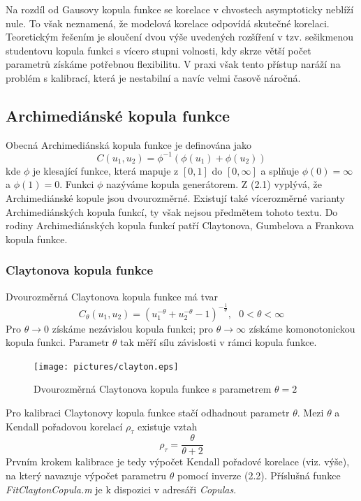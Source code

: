 Na rozdíl od Gausovy kopula funkce se korelace v chvostech asymptoticky neblíží nule. To však neznamená, že modelová korelace odpovídá skutečné korelaci. Teoretickým řešením je sloučení dvou výše uvedených rozšíření v tzv. sešikmenou studentovu kopula funkci s vícero stupni volnosti, kdy skrze větší počet parametrů získáme potřebnou flexibilitu. V praxi však tento přístup naráží na problém s kalibrací, která je nestabilní a navíc velmi časově náročná.

\subsection{Archimediánské kopula funkce}

Obecná Archimediánská kopula funkce je definována jako
\begin{equation}
C(u_1, u_2) = \phi^{-1}\left(\phi(u_1) + \phi(u_2)\right)
\end{equation}
kde $\phi$ je klesající funkce, která mapuje z $[0, 1]$ do $[0, \infty]$ a splňuje $\phi(0) = \infty$ a $\phi(1) = 0$. Funkci $\phi$ nazýváme kopula generátorem. Z (2.1) vyplývá, že Archimediánské kopule jsou dvourozměrné. Existují také vícerozměrné varianty Archimediánských kopula funkcí, ty však nejsou předmětem tohoto textu. Do rodiny Archimediánských kopula funkcí patří Claytonova, Gumbelova a Frankova kopula funkce.

\subsubsection{Claytonova kopula funkce}

Dvourozměrná Claytonova kopula funkce má tvar
\begin{equation*}
C_{\theta}(u_1, u_2) = (u_1^{-\theta} + u_2^{-\theta} - 1)^{-\frac{1}{\theta}}, ~~~ 0 < \theta < \infty
\end{equation*}
Pro $\theta \rightarrow 0$ získáme nezávislou kopula funkci; pro $\theta \rightarrow \infty$ získáme komonotonickou kopula funkci. Parametr $\theta$ tak měří sílu závislosti v rámci kopula funkce.

\begin{figure}[htp]
\centering
\texttt{[image: pictures/clayton.eps]}
\caption{Dvourozměrná Claytonova kopula funkce s parametrem $\theta = 2$}
\end{figure}

Pro kalibraci Claytonovy kopula funkce stačí odhadnout parametr $\theta$. Mezi $\theta$ a Kendall pořadovou korelací $\rho_{\tau}$ existuje vztah
\begin{equation}
\rho_{\tau} = \frac{\theta}{\theta + 2}
\end{equation}
Prvním krokem kalibrace je tedy výpočet Kendall pořadové korelace (viz. výše), na který navazuje výpočet parametru $\theta$ pomocí inverze (2.2). Příslušná funkce \textit{FitClaytonCopula.m} je k dispozici v adresáři \textit{Copulas}.

